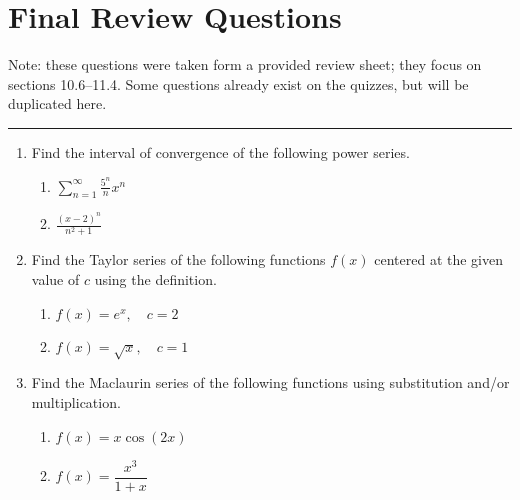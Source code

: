 \chapter{Final Review Questions}

Note: these questions were taken form a provided review sheet;
they focus on sections 10.6--11.4. Some questions already exist on the
quizzes, but will be duplicated here.
\vspace{-2pt}
\hrule
\vspace{10pt}

\begin{enumerate}
  \item Find the interval of convergence of the following power series.

  \begin{enumerate}[itemsep=24em]
    \item \(\displaystyle \sum_{n=1}^{\infty} \frac{5^n}{n}x^n \)

    \item \(\displaystyle \frac{(x-2)^n}{n^2+1} \)
  \end{enumerate}

\newpage %

  \item Find the Taylor series of the following functions \(f(x)\) centered at
    the given value of \(c\) using the definition.
    \begin{enumerate}[itemsep=24em]
      \item \(f(x) = e^x, \quad c = 2\)

      \item \(f(x) = \sqrt{x}, \quad c = 1\)
    \end{enumerate}

\newpage %

  \item Find the Maclaurin series of the following functions using substitution
    and/or multiplication.

    \begin{enumerate}[itemsep=24em]
      \item \(f(x) = x \cos (2x)\)

      \item \(f(x) = \dfrac{x^3}{1+x}\)
    \end{enumerate}

\newpage %


\end{enumerate}
